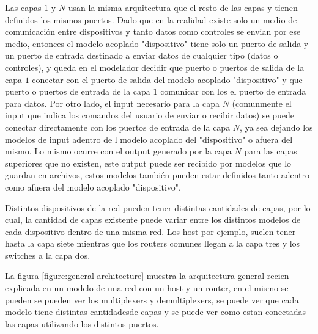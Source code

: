 \documentclass[10pt,a4paper]{article}
\begin{document}
Las capas $1$ y $N$ usan la misma arquitectura que el resto de las capas y tienen definidos los mismos puertos. Dado que en la realidad existe solo un medio de comunicación entre dispositivos y tanto datos como controles se envian por ese medio, entonces el modelo acoplado "dispositivo" tiene solo un puerto de salida y un puerto de entrada destinado a enviar datos de cualquier tipo (datos o controles), y queda en el modelador decidir que puerto o puertos de salida de la capa $1$ conectar con el puerto de salida del modelo acoplado "dispositivo" y que puerto o puertos de entrada de la capa $1$ comunicar con los el puerto de entrada para datos. Por otro lado, el input necesario para la capa $N$ (comunmente el input que indica los comandos del usuario de enviar o recibir datos) se puede conectar directamente con los puertos de entrada de la capa $N$, ya sea dejando los modelos de input adentro de l modelo acoplado del "dispositivo" o afuera del mismo. Lo mismo ocurre con el output generado por la capa $N$ para las capas superiores que no existen, este output puede ser recibido por modelos que lo guardan en archivos, estos modelos también pueden estar definidos tanto adentro como afuera del modelo acoplado "dispositivo".


Distintos dispositivos de la red pueden tener distintas cantidades de capas, por lo cual, la cantidad de capas existente puede variar entre los distintos modelos de cada dispositivo dentro de una misma red. Los host por ejemplo, suelen tener hasta la capa siete mientras que los routers comunes llegan a la capa tres y los switches a la capa dos.

La figura \ref{figure:general architecture} muestra la arquitectura general recien explicada en un modelo de una red con un host y un router, en el mismo se pueden se pueden ver los multiplexers y demultiplexers, se puede ver que cada modelo tiene distintas cantidadesde capas y se puede ver como estan conectadas las capas utilizando los distintos puertos.
\end{document}
